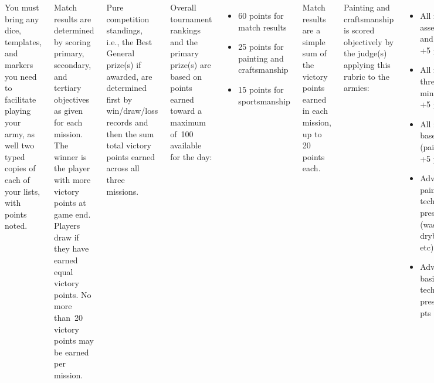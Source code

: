 \documentclass{40k}
\begin{document}
\begin{columns}
You must bring any dice, templates, and markers you need to facilitate
playing your army, as well two typed copies of each of your lists,
with points noted.


%

Match results are determined by scoring primary, secondary, and
tertiary objectives as given for each mission.  The winner is the
player with more victory points at game end.  Players draw if they
have earned equal victory points.  No more than~20 victory points may
be earned per mission.

Pure competition standings, i.e., the Best General prize(s) if
awarded, are determined first by win/draw/loss records and then the
sum total victory points earned across all three missions.

Overall tournament rankings and the primary prize(s) are based on
points earned toward a maximum of~100 available for the day:
\begin{itemize}\shortlist
\item 60 points for match results
\item 25 points for painting and craftsmanship
\item 15 points for sportsmanship
\end{itemize}

Match results are a simple sum of the victory points earned in each
mission, up to 20 points each.

Painting and craftsmanship is scored objectively by the judge(s)
applying this rubric to the armies:

\begin{itemize}\shortlist
\item All models assembled and primed: +5 pts
\item All models three-color minimum: +5 pts
\item All models based (paint/flock): +5 pts
\item Advanced painting techniques present (washes, drybrushing, etc): +5 pts
\item Advanced basing techniques present: +5 pts
\end{itemize}

Sportsmanship scores include two components:
\begin{itemize}\shortlist
\item The sum of sportsmanship scores given after each mission (9 pts
  available).

\item Teams ranking their opponents by most enjoyable to play (6 pts
  available).
\end{itemize}

Please make sure to submit sportsmanship scores as appropriate,
including the final ranking, as otherwise it impairs your opponents'
overall scores!

\end{columns}
\end{document}
